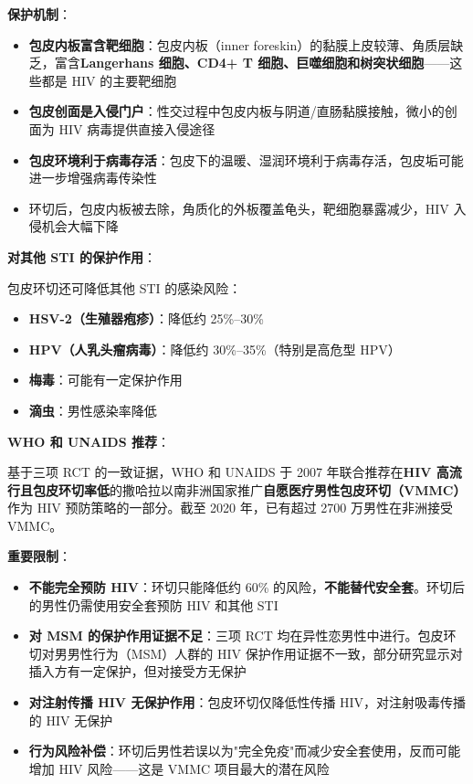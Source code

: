 \documentclass[12pt,a4paper,twoside]{ctexbook}
\begin{document}
\vspace{0.5em}
\noindent\textbf{保护机制}：

\begin{itemize}[leftmargin=2cm]
	\item \textbf{包皮内板富含靶细胞}：包皮内板（inner foreskin）的黏膜上皮较薄、角质层缺乏，富含\textbf{Langerhans 细胞、CD4+ T 细胞、巨噬细胞和树突状细胞}——这些都是 HIV 的主要靶细胞
	\item \textbf{包皮创面是入侵门户}：性交过程中包皮内板与阴道/直肠黏膜接触，微小的创面为 HIV 病毒提供直接入侵途径
	\item \textbf{包皮环境利于病毒存活}：包皮下的温暖、湿润环境利于病毒存活，包皮垢可能进一步增强病毒传染性
	\item 环切后，包皮内板被去除，角质化的外板覆盖龟头，靶细胞暴露减少，HIV 入侵机会大幅下降
\end{itemize}

\vspace{0.5em}
\noindent\textbf{对其他 STI 的保护作用}：

包皮环切还可降低其他 STI 的感染风险：
\begin{itemize}[leftmargin=2cm]
	\item \textbf{HSV-2（生殖器疱疹）}：降低约 25\%--30\%
	\item \textbf{HPV（人乳头瘤病毒）}：降低约 30\%--35\%（特别是高危型 HPV）
	\item \textbf{梅毒}：可能有一定保护作用
	\item \textbf{滴虫}：男性感染率降低
\end{itemize}

\vspace{0.5em}
\noindent\textbf{WHO 和 UNAIDS 推荐}：

基于三项 RCT 的一致证据，WHO 和 UNAIDS 于 2007 年联合推荐在\textbf{HIV 高流行且包皮环切率低}的撒哈拉以南非洲国家推广\textbf{自愿医疗男性包皮环切（VMMC）}作为 HIV 预防策略的一部分。截至 2020 年，已有超过 2700 万男性在非洲接受 VMMC。

\vspace{0.5em}
\noindent\textbf{重要限制}：

\begin{itemize}[leftmargin=2cm]
	\item \textbf{不能完全预防 HIV}：环切只能降低约 60\% 的风险，\textbf{不能替代安全套}。环切后的男性仍需使用安全套预防 HIV 和其他 STI
	\item \textbf{对 MSM 的保护作用证据不足}：三项 RCT 均在异性恋男性中进行。包皮环切对男男性行为（MSM）人群的 HIV 保护作用证据不一致，部分研究显示对插入方有一定保护，但对接受方无保护
	\item \textbf{对注射传播 HIV 无保护作用}：包皮环切仅降低性传播 HIV，对注射吸毒传播的 HIV 无保护
	\item \textbf{行为风险补偿}：环切后男性若误以为"完全免疫"而减少安全套使用，反而可能增加 HIV 风险——这是 VMMC 项目最大的潜在风险
\end{itemize}
\end{document}
